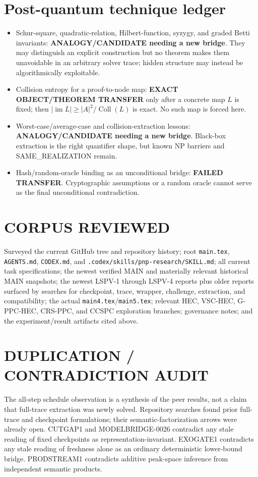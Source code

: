 \documentclass[11pt]{article}
\begin{document}
\section*{Post-quantum technique ledger}
\begin{itemize}
\item Schur-square, quadratic-relation, Hilbert-function, syzygy, and graded
Betti invariants: \textbf{ANALOGY/CANDIDATE needing a new bridge}.  They may
distinguish an explicit construction but no theorem makes them unavoidable in
an arbitrary solver trace; hidden structure may instead be algorithmically
exploitable.
\item Collision entropy for a proof-to-node map: \textbf{EXACT
OBJECT/THEOREM TRANSFER} only after a concrete map $L$ is fixed; then
$|\operatorname{im}L|\ge |A|^2/\operatorname{Coll}(L)$ is exact.  No such map
is forced here.
\item Worst-case/average-case and collision-extraction lessons:
\textbf{ANALOGY/CANDIDATE needing a new bridge}.  Black-box extraction is the
right quantifier shape, but known NP barriers and SAME\_REALIZATION remain.
\item Hash/random-oracle binding as an unconditional bridge:
\textbf{FAILED TRANSFER}.  Cryptographic assumptions or a random oracle cannot
serve as the final unconditional contradiction.
\end{itemize}

\section*{CORPUS REVIEWED}
Surveyed the current GitHub tree and repository history; root
\texttt{main.tex}, \texttt{AGENTS.md}, \texttt{CODEX.md}, and
\texttt{.codex/skills/pnp-research/SKILL.md}; all current task specifications;
the newest verified MAIN and materially relevant historical MAIN snapshots;
the newest LSPV-1 through LSPV-4 reports plus older reports surfaced by searches
for checkpoint, trace, wrapper, challenge, extraction, and compatibility; the
actual \texttt{main4.tex}/\texttt{main5.tex}; relevant HEC, VSC-HEC,
G-PPC-HEC, CRS-PPC, and CCSPC exploration branches; governance notes; and the
experiment/result artifacts cited above.

\section*{DUPLICATION / CONTRADICTION AUDIT}
The all-step schedule observation is a synthesis of the peer results, not a
claim that full-trace extraction was newly solved.  Repository searches found
prior full-trace and checkpoint formulations; their semantic-factorization
arrows were already open.  CUTGAP1 and MODELBRIDGE-0026 contradict any stale
reading of fixed checkpoints as representation-invariant.  EXOGATE1 contradicts
any stale reading of freshness alone as an ordinary deterministic lower-bound
bridge.  PRODSTREAM1 contradicts additive peak-space inference from independent
semantic products.
\end{document}
